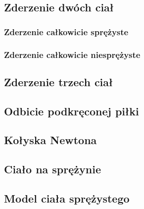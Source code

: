 \subsection{Zderzenie dwóch ciał}

\subsubsection{Zderzenie całkowicie sprężyste}

\subsubsection{Zderzenie całkowicie niesprężyste}

\subsection{Zderzenie trzech ciał}

\subsection{Odbicie podkręconej piłki}

\subsection{Kołyska Newtona}

\subsection{Ciało na sprężynie}

\subsection{Model ciała sprężystego}
